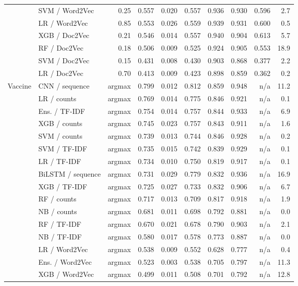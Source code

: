 \begin{longtable}{llrrrrrrrr}
 & SVM / Word2Vec & 0.25 & 0.557 & 0.020 & 0.557 & 0.936 & 0.930 & 0.596 & 2.7 \\
 & LR / Word2Vec & 0.85 & 0.553 & 0.026 & 0.559 & 0.939 & 0.931 & 0.600 & 0.5 \\
 & XGB / Doc2Vec & 0.21 & 0.546 & 0.014 & 0.557 & 0.940 & 0.904 & 0.613 & 5.7 \\
 & RF / Doc2Vec & 0.18 & 0.506 & 0.009 & 0.525 & 0.924 & 0.905 & 0.553 & 18.9 \\
 & SVM / Doc2Vec & 0.15 & 0.431 & 0.008 & 0.430 & 0.903 & 0.868 & 0.377 & 2.2 \\
 & LR / Doc2Vec & 0.70 & 0.413 & 0.009 & 0.423 & 0.898 & 0.859 & 0.362 & 0.2 \\
\midrule
Vaccine & CNN / sequence & argmax & 0.799 & 0.012 & 0.812 & 0.859 & 0.948 & n/a & 11.2 \\
 & LR / counts & argmax & 0.769 & 0.014 & 0.775 & 0.846 & 0.921 & n/a & 0.1 \\
 & Ens. / TF-IDF & argmax & 0.754 & 0.014 & 0.757 & 0.844 & 0.933 & n/a & 6.9 \\
 & XGB / counts & argmax & 0.745 & 0.023 & 0.757 & 0.843 & 0.911 & n/a & 1.6 \\
 & SVM / counts & argmax & 0.739 & 0.013 & 0.744 & 0.846 & 0.928 & n/a & 0.2 \\
 & SVM / TF-IDF & argmax & 0.735 & 0.015 & 0.742 & 0.839 & 0.929 & n/a & 0.1 \\
 & LR / TF-IDF & argmax & 0.734 & 0.010 & 0.750 & 0.819 & 0.917 & n/a & 0.1 \\
 & BiLSTM / sequence & argmax & 0.731 & 0.029 & 0.779 & 0.832 & 0.936 & n/a & 16.9 \\
 & XGB / TF-IDF & argmax & 0.725 & 0.027 & 0.733 & 0.832 & 0.906 & n/a & 6.7 \\
 & RF / counts & argmax & 0.717 & 0.013 & 0.709 & 0.817 & 0.918 & n/a & 1.9 \\
 & NB / counts & argmax & 0.681 & 0.011 & 0.698 & 0.792 & 0.881 & n/a & 0.0 \\
 & RF / TF-IDF & argmax & 0.670 & 0.021 & 0.678 & 0.790 & 0.903 & n/a & 2.1 \\
 & NB / TF-IDF & argmax & 0.580 & 0.017 & 0.578 & 0.773 & 0.887 & n/a & 0.0 \\
 & LR / Word2Vec & argmax & 0.538 & 0.009 & 0.552 & 0.628 & 0.777 & n/a & 0.4 \\
 & Ens. / Word2Vec & argmax & 0.523 & 0.003 & 0.538 & 0.705 & 0.797 & n/a & 11.3 \\
 & XGB / Word2Vec & argmax & 0.499 & 0.011 & 0.508 & 0.701 & 0.792 & n/a & 12.8 \\

\end{longtable}
